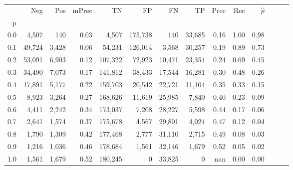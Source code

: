 \begin{tabular}{rrrrrrrrrrrrrr}
\toprule
{} &     Neg &    Pos & mPrec &       TN &       FP &      FN &      TP &  Prec &   Rec & $\hat{p}$ \\
p   &         &        &       &          &          &         &         &       &       &           \\
\midrule
0.0 &   4,507 &    140 &  0.03 &    4,507 &  175,738 &     140 &  33,685 &  0.16 &  1.00 &      0.98 \\
0.1 &  49,724 &  3,428 &  0.06 &   54,231 &  126,014 &   3,568 &  30,257 &  0.19 &  0.89 &      0.73 \\
0.2 &  53,091 &  6,903 &  0.12 &  107,322 &   72,923 &  10,471 &  23,354 &  0.24 &  0.69 &      0.45 \\
0.3 &  34,490 &  7,073 &  0.17 &  141,812 &   38,433 &  17,544 &  16,281 &  0.30 &  0.48 &      0.26 \\
0.4 &  17,891 &  5,177 &  0.22 &  159,703 &   20,542 &  22,721 &  11,104 &  0.35 &  0.33 &      0.15 \\
0.5 &   8,923 &  3,264 &  0.27 &  168,626 &   11,619 &  25,985 &   7,840 &  0.40 &  0.23 &      0.09 \\
0.6 &   4,411 &  2,242 &  0.34 &  173,037 &    7,208 &  28,227 &   5,598 &  0.44 &  0.17 &      0.06 \\
0.7 &   2,641 &  1,574 &  0.37 &  175,678 &    4,567 &  29,801 &   4,024 &  0.47 &  0.12 &      0.04 \\
0.8 &   1,790 &  1,309 &  0.42 &  177,468 &    2,777 &  31,110 &   2,715 &  0.49 &  0.08 &      0.03 \\
0.9 &   1,216 &  1,036 &  0.46 &  178,684 &    1,561 &  32,146 &   1,679 &  0.52 &  0.05 &      0.02 \\
1.0 &   1,561 &  1,679 &  0.52 &  180,245 &        0 &  33,825 &       0 &   nan &  0.00 &      0.00 \\
\bottomrule
\end{tabular}
